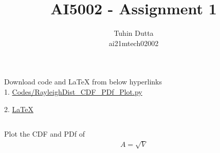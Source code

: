 \documentclass[journal,12pt,twocolumn]{IEEEtran}
\begin{document}
\providecommand{\mtx}[1]{\mathbf{#1}}
\providecommand{\fourier}{\overset{\mathcal{F}}{ \rightleftharpoons}}
\providecommand{\system}{\overset{\mathcal{H}}{ \longleftrightarrow}}
\newcommand{\solution}{\noindent \textbf{Solution: }}
\newcommand{\cosec}{\,\text{cosec}\,}
\providecommand{\dec}[2]{\ensuremath{\overset{#1}{\underset{#2}{\gtrless}}}}
\newcommand{\myvec}[1]{\ensuremath{\begin{pmatrix}#1\end{pmatrix}}}
\newcommand{\mydet}[1]{\ensuremath{\begin{vmatrix}#1\end{vmatrix}}}
\makeatletter
{}
\makeatother
\let\StandardTheFigure\thefigure
\let\vec\mathbf
\renewcommand{\thefigure}{\theproblem}
\def\putbox#1#2#3{\makebox[0in][l]{\makebox[#1][l]{}\raisebox{\baselineskip}[0in][0in]{\raisebox{#2}[0in][0in]{#3}}}}
     \def\rightbox#1{\makebox[0in][r]{#1}}
     \def\centbox#1{\makebox[0in]{#1}}
     \def\topbox#1{\raisebox{-\baselineskip}[0in][0in]{#1}}
     \def\midbox#1{\raisebox{-0.5\baselineskip}[0in][0in]{#1}}
\vspace{3cm}
\title{AI5002 - Assignment 1}
\author{Tuhin Dutta\\ ai21mtech02002}
\maketitle
\newpage
\bigskip
\renewcommand{\thefigure}{\theenumi}
\renewcommand{\thetable}{\theenumi}
\begin{mdframed}
Download code and LaTeX from below hyperlinks\\
1. \href{https://github.com/Tauhait/AI5002/blob/main/Assignment-1/Codes/RayleighDist\_CDF\_PDf\_Plot.py}{Codes/RayleighDist\_CDF\_PDf\_Plot.py}


2. \href{https://github.com/Tauhait/AI5002/tree/main/Assignment-1/LaTeX}{LaTeX}
\end{mdframed}
\subsection*{}

Plot the CDF and PDf of\\
\begin{align}
A = \sqrt{V}
\end{align}
\end{document}
